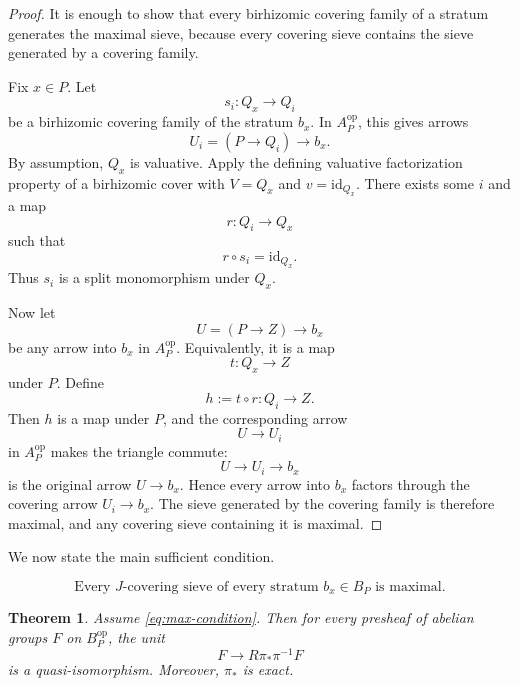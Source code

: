 \documentclass[12pt]{article}
\newtheorem{theorem}{Theorem}[section]
\theoremstyle{definition}
\theoremstyle{remark}
\numberwithin{equation}{section}
\newcommand{\op}{\mathrm{op}}
\newcommand{\id}{\mathrm{id}}
\begin{document}
\begin{proof}
It is enough to show that every birhizomic covering family of a stratum generates the maximal sieve, because every covering sieve contains the sieve generated by a covering family.

Fix \(x\in P\).  Let
\[
s_i:Q_x\longrightarrow Q_i
\]
be a birhizomic covering family of the stratum \(b_x\).  In \(A_P^{\op}\), this gives arrows
\[
U_i=(P\to Q_i)\longrightarrow b_x.
\]
By assumption, \(Q_x\) is valuative.  Apply the defining valuative factorization property of a birhizomic cover with \(V=Q_x\) and \(v=\id_{Q_x}\).  There exists some \(i\) and a map
\[
r:Q_i\longrightarrow Q_x
\]
such that
\[
r\circ s_i=\id_{Q_x}.
\]
Thus \(s_i\) is a split monomorphism under \(Q_x\).

Now let
\[
U=(P\to Z)\longrightarrow b_x
\]
be any arrow into \(b_x\) in \(A_P^{\op}\).  Equivalently, it is a map
\[
t:Q_x\longrightarrow Z
\]
under \(P\).  Define
\[
h:=t\circ r:Q_i\longrightarrow Z.
\]
Then \(h\) is a map under \(P\), and the corresponding arrow
\[
U\longrightarrow U_i
\]
in \(A_P^{\op}\) makes the triangle commute:
\[
U\longrightarrow U_i\longrightarrow b_x
\]
is the original arrow \(U\to b_x\).  Hence every arrow into \(b_x\) factors through the covering arrow \(U_i\to b_x\).  The sieve generated by the covering family is therefore maximal, and any covering sieve containing it is maximal.
\end{proof}

We now state the main sufficient condition.

\begin{equation}\label{eq:max-condition}
\tag{Max}
\text{Every \(J\)-covering sieve of every stratum \(b_x\in B_P\) is maximal.}
\end{equation}

\begin{theorem}\label{thm:max-criterion}
Assume \eqref{eq:max-condition}.  Then for every presheaf of abelian groups \(F\) on \(B_P^{\op}\), the unit
\[
F\longrightarrow R\pi_*\pi^{-1}F
\]
is a quasi-isomorphism.  Moreover, \(\pi_*\) is exact.
\end{theorem}
\end{document}
